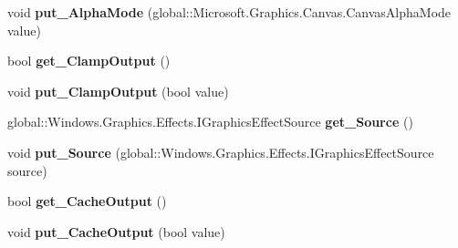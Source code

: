 \begin{DoxyCompactItemize}
void {\bfseries put\+\_\+\+Alpha\+Mode} (global\+::\+Microsoft.\+Graphics.\+Canvas.\+Canvas\+Alpha\+Mode value)
\item 
\mbox{\label{class_microsoft_1_1_graphics_1_1_canvas_1_1_effects_1_1_color_matrix_effect_a8f24f3336c23b20f9db23f8a09141338}} 
bool {\bfseries get\+\_\+\+Clamp\+Output} ()
\item 
\mbox{\label{class_microsoft_1_1_graphics_1_1_canvas_1_1_effects_1_1_color_matrix_effect_aef6085c7c12fe7233bd318ecd406ce13}} 
void {\bfseries put\+\_\+\+Clamp\+Output} (bool value)
\item 
\mbox{\label{class_microsoft_1_1_graphics_1_1_canvas_1_1_effects_1_1_color_matrix_effect_a53395ee86eb2e91948c5e28aa877e46a}} 
global\+::\+Windows.\+Graphics.\+Effects.\+I\+Graphics\+Effect\+Source {\bfseries get\+\_\+\+Source} ()
\item 
\mbox{\label{class_microsoft_1_1_graphics_1_1_canvas_1_1_effects_1_1_color_matrix_effect_a5c460636172b94a6c671e8882c4e86a9}} 
void {\bfseries put\+\_\+\+Source} (global\+::\+Windows.\+Graphics.\+Effects.\+I\+Graphics\+Effect\+Source source)
\item 
\mbox{\label{class_microsoft_1_1_graphics_1_1_canvas_1_1_effects_1_1_color_matrix_effect_a6f8ec6fe9afbcf59d1aa58feae0b52fa}} 
bool {\bfseries get\+\_\+\+Cache\+Output} ()
\item 
\mbox{\label{class_microsoft_1_1_graphics_1_1_canvas_1_1_effects_1_1_color_matrix_effect_a21deeeb659fc28247a99012bb0bae246}} 
void {\bfseries put\+\_\+\+Cache\+Output} (bool value)
\item 
\mbox{\label{class_microsoft_1_1_graphics_1_1_canvas_1_1_effects_1_1_color_matrix_effect_a91fe729e04af0a6ca36d659c3cd5262c}} 

\end{DoxyCompactItemize}
